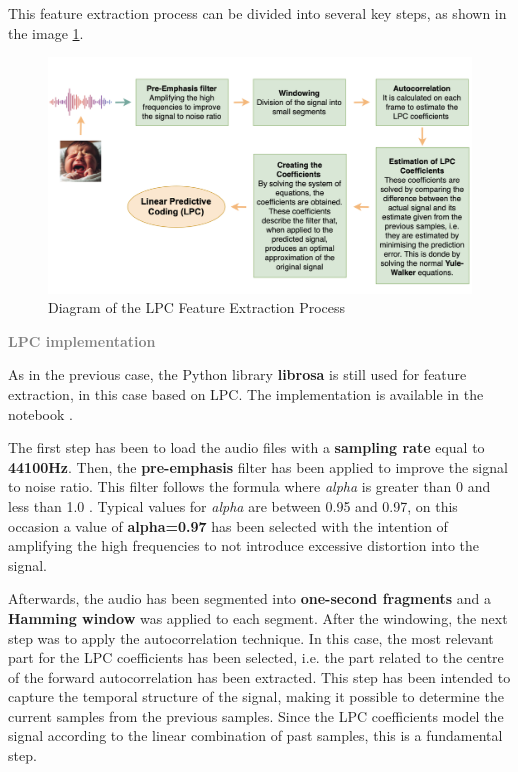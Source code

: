This feature extraction process can be divided into several key steps, as shown in the image \ref{fig:LPC-diagram}.

\begin{figure}[h]
\centering
    \includegraphics[width=1\textwidth]{figures/LPC-diagram.png}
\caption{Diagram of the LPC Feature Extraction Process}
\label{fig:LPC-diagram}
\end{figure}


{\fontsize{16pt}{16pt}\textcolor{gray}{\textbf{LPC implementation}}}

As in the previous case, the Python library \textbf{librosa} is still used for feature extraction, in this case based on LPC. The implementation is available in the notebook .

The first step has been to load the audio files with a \textbf{sampling rate} equal to \textbf{44100Hz}. Then, the \textbf{pre-emphasis} filter has been applied to improve the signal to noise ratio. This filter follows the formula where \textit{alpha} is greater than 0 and less than 1.0 \cite{GrabVoice2024}. Typical values for \textit{alpha} are between 0.95 and 0.97, on this occasion a value of \textbf{alpha=0.97} has been selected with the intention of amplifying the high frequencies to not introduce excessive distortion into the signal. 

Afterwards, the audio has been segmented into \textbf{one-second fragments} and a \textbf{Hamming window} was applied to each segment. After the windowing, the next step was to apply the autocorrelation technique. In this case, the most relevant part for the LPC coefficients has been selected, i.e. the part related to the centre of the forward autocorrelation has been extracted. This step has been intended to capture the temporal structure of the signal, making it possible to determine the current samples from the previous samples. Since the LPC coefficients model the signal according to the linear combination of past samples, this is a fundamental step. 


